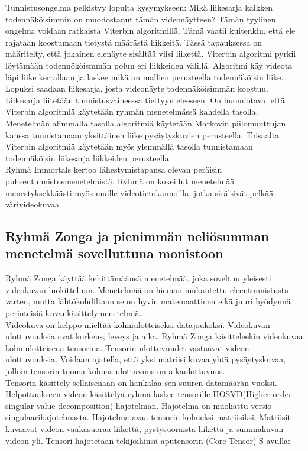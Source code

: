 Tunnistusongelma pelkistyy lopulta kysymykseen: Mikä liikesarja kaikken todennäköisimmin on muodostanut tämän videonäytteen?
Tämän tyylinen ongelma voidaan ratkaista Viterbin algoritmillä. Tämä vaatii kuitenkin, että ele rajataan koostumaan tietystä määrästä liikkeitä.
Tässä tapauksessa on määritelty, että jokainen elenäyte sisältää viisi liikettä.
Viterbin algoritmi pyrkii löytämään todennököismmän polun eri liikkeiden välillä. Algoritmi käy videota läpi liike kerrallaan ja laskee mikä
on mallien perusteella todennäköisin liike. Lopuksi saadaan liikesarja, josta videonäyte todennäköisimmän koostuu.
Liikesarja liitetään tunnistusvaiheessa tiettyyn eleeseen. \citep {6239185} On huomiotava, että Viterbin algoritmiä käytetään ryhmän menetelmässä 
kahdella tasolla. Menetelmän alimmalla tasolla algoritmiä käytetään Markovin piilomuuttujan kanssa tunnistamaan yksittäinen liike pysäytyskuvien perusteella. 
Toisaalta Viterbin algoritmiä käytetään myös ylemmällä tasolla tunnistamaan todennäköisin liikesarja liikkeiden perusteella.\citep {6239185}\\

Ryhmä Immortals kertoo lähestymistapansa olevan peräisin puheentunnistusmenetelmistä. Ryhmä on kokeillut menetelmää menestyksekkäästi myös muille videotietokannoilla,
jotka sisälsivät pelkää värivideokuvaa. \citep{firstround}\\


\subsection{Ryhmä Zonga ja pienimmän neliösumman menetelmä sovelluttuna monistoon}
Ryhmä Zonga käyttää kehittämäänsä menetelmää, joka soveltuu yleisesti videokuvan luokitteluun. 
Menetelmää on hieman mukautettu eleentunnistusta varten, mutta lähtökohdiltaan se on hyvin 
matemaattinen eikä juuri hyödynnä perinteisiä kuvankäsittelymenetelmiä. \citep {6239180}\\

Videokuva on helppo mieltää kolmiulotteiseksi datajoukoksi. Videokuvan ulottuvuuksia ovat korkeus, leveys ja aika.
Ryhmä Zonga käsitteleekin videokuvaa kolmiulotteisena tensorina. Tensorin ulottuvuudet vastaavat videon ulottuvuuksia.
Voidaan ajatella, että yksi matriisi kuvaa yhtä pysäytyskuvaa, jolloin tensorin tuoma kolmas ulottuvuus on aikaulottuvuus. \citep {6239180}\\

Tensorin käsittely sellaisenaan on hankalaa sen suuren datamäärän vuoksi. Helpottaakseen videon käsittelyä
ryhmä laskee tensorille HOSVD(Higher-order singular value decomposition)-hajotelman. Hajotelma on muokattu versio
singulaarihajotelmasta. Hajotelma avaa tensorin kolmeksi matriisiksi.
Matriisit kuvaavat videon vaakasuoraa liikettä, pystysuoraista liikettä ja summakuvan videon yli. \citep {HOSVD} 
Tensori hajotetaan tekijöihinsä aputensorin (Core Tensor) S avulla:

